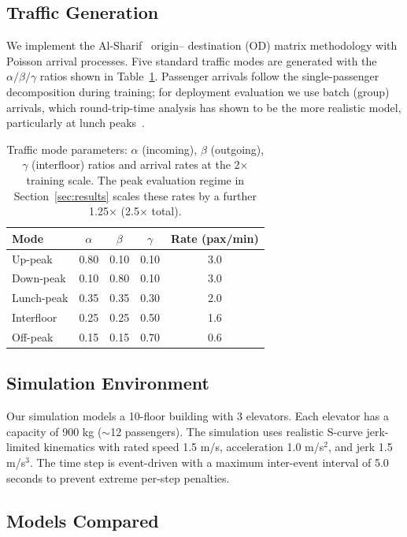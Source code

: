 \documentclass[conference]{IEEEtran}
\begin{document}
\subsection{Traffic Generation}

We implement the Al-Sharif~\cite{alsharif2020traffic} origin--
destination (OD) matrix methodology with Poisson arrival processes.
Five standard traffic modes are generated with the $\alpha/\beta/
\gamma$ ratios shown in Table~\ref{tab:traffic_modes}. Passenger
arrivals follow the single-passenger decomposition during training;
for deployment evaluation we use batch (group) arrivals, which
round-trip-time analysis has shown to be the more realistic model,
particularly at lunch peaks~\cite{so2022batch}.

\begin{table}[t]
\centering
\caption{Traffic mode parameters: $\alpha$ (incoming),
$\beta$ (outgoing), $\gamma$ (interfloor) ratios and arrival rates
at the 2$\times$ training scale. The peak evaluation regime in
Section~\ref{sec:results} scales these rates by a further
1.25$\times$ (2.5$\times$ total).}
\label{tab:traffic_modes}
\begin{tabular}{@{}lcccc@{}}
\toprule
Mode & $\alpha$ & $\beta$ & $\gamma$ & Rate (pax/min) \\
\midrule
Up-peak & 0.80 & 0.10 & 0.10 & 3.0 \\
Down-peak & 0.10 & 0.80 & 0.10 & 3.0 \\
Lunch-peak & 0.35 & 0.35 & 0.30 & 2.0 \\
Interfloor & 0.25 & 0.25 & 0.50 & 1.6 \\
Off-peak & 0.15 & 0.15 & 0.70 & 0.6 \\
\bottomrule
\end{tabular}
\end{table}

\subsection{Simulation Environment}

Our simulation models a 10-floor building with 3 elevators. Each
elevator has a capacity of 900 kg ($\sim$12 passengers). The
simulation uses realistic S-curve jerk-limited kinematics with rated
speed 1.5 m/s, acceleration 1.0 m/s$^2$, and jerk 1.5 m/s$^3$. The
time step is event-driven with a maximum inter-event interval of 5.0
seconds to prevent extreme per-step penalties.

\subsection{Models Compared}
\end{document}
